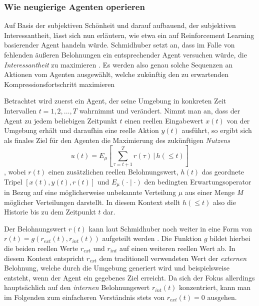 \subsubsection{Wie neugierige Agenten operieren}
Auf Basis der subjektiven Schönheit und darauf aufbauend, der subjektiven Interessantheit, lässt sich nun erläutern, wie etwa ein auf Reinforcement Learning basierender Agent handeln würde. 
Schmidhuber setzt an, dass im Falle von fehlenden äußeren Belohnungen ein entsprechender Agent versuchen würde, die \emph{Interessantheit} zu maximieren \cite[p.~8]{curiosity_schmidhuber}.
Es werden also genau solche Sequenzen an Aktionen vom Agenten ausgewählt, welche zukünftig den zu erwartenden Kompressionsfortschritt maximieren \cite[p.~8]{curiosity_schmidhuber}

Betrachtet wird zuerst ein Agent, der seine Umgebung in konkreten Zeit Intervallen \(t = 1,2, \dots ,T\) wahrnimmt und verändert. 
Nimmt man an, dass der Agent zu jedem beliebigen Zeitpunkt \(t\) einen reellen Eingabewert \(x(t)\) von der Umgebung erhält und daraufhin eine reelle Aktion \(y(t)\) ausführt, so ergibt sich als finales Ziel für den Agenten die Maximierung des zukünftigen \emph{Nutzens} 
\begin{equation} \label{eq:objective_curiosity}
  u(t) = E_\mu \left[ \sum^T_{\tau=t+1} r(\tau) \, \Bigg\vert \, h(\leq t)\right]  
\end{equation}
, wobei \(r(t)\) einen zusätzlichen reellen Belohnungswert, \(h(t)\) das geordnete Tripel \(\left[ x(t),y(t),r(t)\right]\) und \(E_\mu(\cdot \mid \cdot)\) den bedingten Erwartungsoperator in Bezug auf eine möglicherweise unbekannte Verteilung \(\mu\) aus einer Menge \emph{M} möglicher Verteilungen darstellt. \cite[p.~17]{curiosity_schmidhuber}
In diesem Kontext stellt \(h(\leq t)\) also die Historie bis zu dem Zeitpunkt \(t\) dar.

Der Belohnungswert \(r(t)\) kann laut Schmidhuber noch weiter in eine Form von \(r(t) = g(r_{ext}(t),r_{int}(t))\) aufgeteilt werden \cite{curiosity_schmidhuber}.
Die Funktion \(g\) bildet hierbei die beiden reellen Werte \(r_{ext}\) und \(r_{int}\) auf einen weiteren reellen Wert ab. In diesem Kontext entspricht \(r_{ext}\) dem traditionell verwendeten Wert der \emph{externen} Belohnung, welche durch die Umgebung generiert wird und beispielsweise entsteht, wenn der Agent ein gegebenes Ziel erreicht. 
Da sich der Fokus allerdings hauptsächlich auf den \emph{internen} Belohnungswert \(r_{int}(t)\) konzentriert, kann man im Folgenden zum einfacheren Verständnis stets von \(r_{ext}(t) = 0\) ausgehen.

